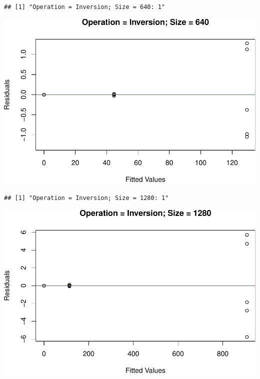 \documentclass[
]{article}
\begin{document}
\begin{verbatim}
## [1] "Operation = Inversion; Size = 640: 1"
\end{verbatim}

\includegraphics{main_files/figure-latex/unnamed-chunk-20-23.pdf}

\begin{verbatim}
## [1] "Operation = Inversion; Size = 1280: 1"
\end{verbatim}

\includegraphics{main_files/figure-latex/unnamed-chunk-20-24.pdf}
\end{document}
